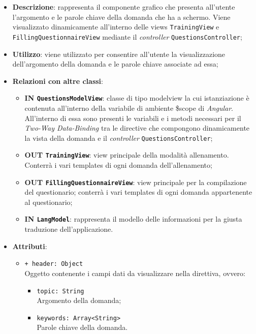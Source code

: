 		\begin{itemize}
			\item \textbf{Descrizione}: rappresenta il componente grafico che presenta all'utente l'argomento e le parole chiave della domanda che ha a schermo. Viene visualizzato dinamicamente all'interno delle views \texttt{TrainingView} e \texttt{FillingQuestionnaireView} mediante il \textit{controller} \texttt{QuestionsController};
			\item \textbf{Utilizzo}: viene utilizzato per consentire all'utente la visualizzazione dell'argomento della domanda e le parole chiave associate ad essa;
			\item \textbf{Relazioni con altre classi}: 
			\begin{itemize}
				\item \textbf{IN \texttt{QuestionsModelView}}: classe di tipo modelview la cui istanziazione è contenuta all'interno della variabile di ambiente \$scope di \textit{Angular}. All'interno di essa sono presenti le variabili e i metodi necessari per il \textit{Two-Way Data-Binding} tra le directive che compongono dinamicamente la vista della domanda e il \textit{controller} \texttt{QuestionsController};
				\item \textbf{OUT \texttt{TrainingView}}: view principale della modalità allenamento. Conterrà i vari templates di ogni domanda dell'allenamento;
				\item \textbf{OUT \texttt{FillingQuestionnaireView}}: view principale per la compilazione del questionario; conterrà i vari templates di ogni domanda appartenente al questionario;   
				\item \textbf{IN \texttt{LangModel}}: rappresenta il modello delle informazioni per la giusta traduzione dell'applicazione.
			\end{itemize}
			\item \textbf{Attributi}:
			\begin{itemize}
				\item \texttt{+ header: Object} \\ Oggetto contenente i campi dati da visualizzare nella direttiva, ovvero:
				\begin{itemize}
					\item \texttt{topic: String} \\ Argomento della domanda;
					\item \texttt{keywords: Array<String>} \\ Parole chiave della domanda.
				\end{itemize}

\end{itemize}
\end{itemize}
